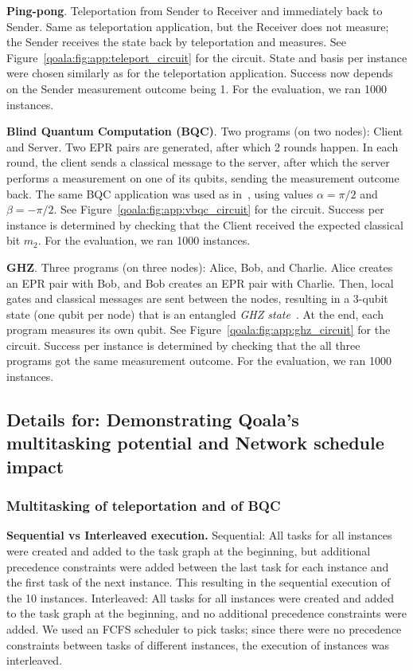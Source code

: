 \textbf{Ping-pong}. Teleportation from Sender to Receiver and immediately back to Sender.
Same as teleportation application, but the Receiver does not measure; the Sender receives the state back by teleportation and measures.
See Figure~\ref{qoala:fig:app:teleport_circuit} for the circuit.
State and basis per instance were chosen similarly as for the teleportation application.
Success now depends on the Sender measurement outcome being 1.
For the evaluation, we ran 1000 instances.

\textbf{Blind Quantum Computation (BQC)}.
Two programs (on two nodes): Client and Server.
Two EPR pairs are generated, after which 2 rounds happen. In each round, the client sends a classical message to the server, after which the server performs a measurement on one of its qubits, sending the measurement outcome back.
The same BQC application was used as in~\cite{dahlberg2022netqasm}, using values $\alpha = \pi/2$ and $\beta = -\pi/2$.
See Figure~\ref{qoala:fig:app:vbqc_circuit} for the circuit.
Success per instance is determined by checking that the Client received the expected classical bit $m_2$.
For the evaluation, we ran 1000 instances.

\textbf{GHZ}. 
Three programs (on three nodes): Alice, Bob, and Charlie.
Alice creates an EPR pair with Bob, and Bob creates an EPR pair with Charlie.
Then, local gates and classical messages are sent between the nodes, resulting in a 3-qubit state (one qubit per node) that is an entangled \textit{GHZ state}~\cite{greenberger1989going}.
At the end, each program measures its own qubit.
See Figure~\ref{qoala:fig:app:ghz_circuit} for the circuit.
Success per instance is determined by checking that the all three programs got the same measurement outcome.
For the evaluation, we ran 1000 instances.

\subsection{Details for: Demonstrating Qoala's multitasking potential and Network schedule impact}

\subsubsection{Multitasking of teleportation and of BQC}
\textbf{Sequential vs Interleaved execution.}
Sequential: All tasks for all instances were created and added to the task graph at the beginning, but additional precedence constraints were added between the last task for each instance and the first task of the next instance. This resulting in the sequential execution of the 10 instances.
Interleaved: All tasks for all instances were created and added to the task graph at the beginning, and no additional precedence constraints were added. We used an FCFS scheduler to pick tasks; since there were no precedence constraints between tasks of different instances, the execution of instances was interleaved.

